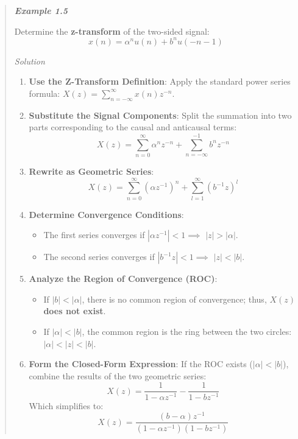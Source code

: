 \begin{quote}
\textbf{\emph{Example 1.5}}

Determine the \textbf{z-transform} of the two-sided signal:
\[x(n) = \alpha^n u(n) + b^n u(-n-1)\]

\emph{Solution}

\begin{enumerate}
\def\labelenumi{\arabic{enumi}.}
\tightlist
\item
  \textbf{Use the Z-Transform Definition}: Apply the standard power
  series formula: \(X(z) = \sum_{n=-\infty}^{\infty} x(n)z^{-n}\).
\item
  \textbf{Substitute the Signal Components}: Split the summation into
  two parts corresponding to the causal and anticausal terms:
  \[X(z) = \sum_{n=0}^{\infty} \alpha^n z^{-n} + \sum_{n=-\infty}^{-1} b^n z^{-n}\]
\item
  \textbf{Rewrite as Geometric Series}:
  \[X(z) = \sum_{n=0}^{\infty} (\alpha z^{-1})^n + \sum_{l=1}^{\infty} (b^{-1} z)^l\]
\item
  \textbf{Determine Convergence Conditions}:

  \begin{itemize}
  \tightlist
  \item
    The first series converges if \(|\alpha z^{-1}| < 1 \implies\)
    \textbf{\(|z| > |\alpha|\)}.
  \item
    The second series converges if \(|b^{-1} z| < 1 \implies\)
    \textbf{\(|z| < |b|\)}.
  \end{itemize}
\item
  \textbf{Analyze the Region of Convergence (ROC)}:

  \begin{itemize}
  \tightlist
  \item
    If \textbf{\(|b| < |\alpha|\)}, there is no common region of
    convergence; thus, \textbf{\(X(z)\) does not exist}.
  \item
    If \textbf{\(|\alpha| < |b|\)}, the common region is the ring
    between the two circles: \textbf{\(|\alpha| < |z| < |b|\)}.
  \end{itemize}
\item
  \textbf{Form the Closed-Form Expression}: If the ROC exists
  (\(|\alpha| < |b|\)), combine the results of the two geometric series:
  \[X(z) = \frac{1}{1 - \alpha z^{-1}} - \frac{1}{1 - b z^{-1}}\] Which
  simplifies to:
  \textbf{\[X(z) = \frac{(b - \alpha) z^{-1}}{(1 - \alpha z^{-1})(1 - b z^{-1})}\]}
\end{enumerate}
\end{quote}

